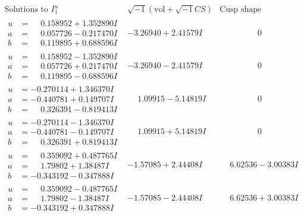 \documentclass[1p]{elsarticle_modified}
\theoremstyle{definition}
\newcommand{\I}{\sqrt{-1}}
\begin{document}
$$\begin{array}{c|c|c}
\text{Solutions to }I^u_{1}& \I (\text{vol} + \sqrt{-1}CS) & \text{Cusp shape}\\
 \hline 
\begin{aligned}
u &= \phantom{-}0.158952 + 1.352890 I \\
a &= \phantom{-}0.057726 - 0.217470 I \\
b &= \phantom{-}0.119895 + 0.688596 I\end{aligned}
 & -3.26940 + 2.41579 I & \phantom{-0.000000 } 0 \\ \hline\begin{aligned}
u &= \phantom{-}0.158952 - 1.352890 I \\
a &= \phantom{-}0.057726 + 0.217470 I \\
b &= \phantom{-}0.119895 - 0.688596 I\end{aligned}
 & -3.26940 - 2.41579 I & \phantom{-0.000000 } 0 \\ \hline\begin{aligned}
u &= -0.270114 + 1.346370 I \\
a &= -0.440781 + 0.149707 I \\
b &= \phantom{-}0.326391 - 0.819413 I\end{aligned}
 & \phantom{-}1.09915 - 5.14819 I & \phantom{-0.000000 } 0 \\ \hline\begin{aligned}
u &= -0.270114 - 1.346370 I \\
a &= -0.440781 - 0.149707 I \\
b &= \phantom{-}0.326391 + 0.819413 I\end{aligned}
 & \phantom{-}1.09915 + 5.14819 I & \phantom{-0.000000 } 0 \\ \hline\begin{aligned}
u &= \phantom{-}0.359092 + 0.487765 I \\
a &= \phantom{-}1.79802 + 1.38487 I \\
b &= -0.343192 - 0.347888 I\end{aligned}
 & -1.57085 + 2.44408 I & \phantom{-}6.62536 - 3.00383 I \\ \hline\begin{aligned}
u &= \phantom{-}0.359092 - 0.487765 I \\
a &= \phantom{-}1.79802 - 1.38487 I \\
b &= -0.343192 + 0.347888 I\end{aligned}
 & -1.57085 - 2.44408 I & \phantom{-}6.62536 + 3.00383 I \\ \hline\begin{aligned}

\end{aligned}
\end{array}$$
\end{document}
